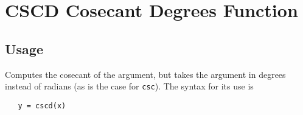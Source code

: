 \section{CSCD Cosecant Degrees Function}

\subsection{Usage}

Computes the cosecant of the argument, but takes
the argument in degrees instead of radians (as is the case
for \verb|csc|). The syntax for its use is
\begin{verbatim}
   y = cscd(x)
\end{verbatim}
